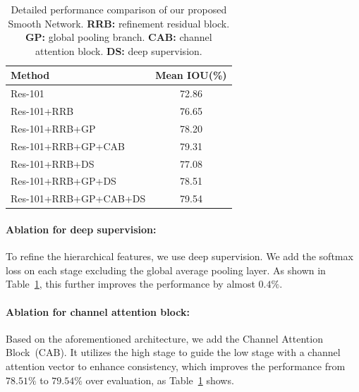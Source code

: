 \documentclass[10pt,twocolumn,letterpaper]{article}
\begin{document}
\begin{table}[t]
\begin{center}
\caption{Detailed performance comparison of our proposed Smooth Network. \textbf{RRB:} refinement residual block. \textbf{GP:} global pooling branch. \textbf{CAB:} channel attention block. \textbf{DS:} deep supervision. }
\label{tab:combine}
\begin{tabular}{lc}
\toprule
Method & Mean IOU(\%)\\
\hline
 \noalign{\smallskip}
Res-101 & 72.86\\
Res-101+RRB & 76.65\\
\hline
 \noalign{\smallskip}
Res-101+RRB+GP & 78.20\\
Res-101+RRB+GP+CAB & 79.31\\
\hline
 \noalign{\smallskip}
Res-101+RRB+DS & 77.08\\
Res-101+RRB+GP+DS & 78.51\\
Res-101+RRB+GP+CAB+DS & 79.54\\
\bottomrule
\end{tabular}
\end{center}
\end{table}

\vspace{-2ex}    
\paragraph{Ablation for deep supervision:} To refine the hierarchical features, we use deep supervision. We add the softmax loss on each stage excluding the global average pooling layer. As shown in Table~\ref{tab:combine}, this further improves the performance by almost $0.4\%$.

\vspace{-2ex}    
\paragraph{Ablation for channel attention block:} Based on the aforementioned architecture, we add the Channel Attention Block~(CAB). It utilizes the high stage to guide the low stage with a channel attention vector to enhance consistency, which improves the performance from $78.51\%$ to $79.54\%$ over evaluation, as Table~\ref{tab:combine} shows.
\end{document}
